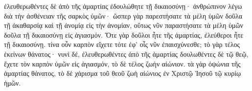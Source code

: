 \documentclass{openreader}
\begin{document}
ἐλευθερωθέντες δὲ ἀπὸ τῆς ἁμαρτίας ἐδουλώθητε τῇ δικαιοσύνῃ· 
ἀνθρώπινον λέγω διὰ τὴν ἀσθένειαν τῆς σαρκὸς ὑμῶν· ὥσπερ γὰρ παρεστήσατε τὰ μέλη ὑμῶν δοῦλα τῇ ἀκαθαρσίᾳ καὶ τῇ ἀνομίᾳ εἰς τὴν ἀνομίαν, οὕτως νῦν παραστήσατε τὰ μέλη ὑμῶν δοῦλα τῇ δικαιοσύνῃ εἰς ἁγιασμόν. 
Ὅτε γὰρ δοῦλοι ἦτε τῆς ἁμαρτίας, ἐλεύθεροι ἦτε τῇ δικαιοσύνῃ. 
τίνα οὖν καρπὸν εἴχετε τότε ἐφ’ οἷς νῦν ἐπαισχύνεσθε; τὸ γὰρ τέλος ἐκείνων θάνατος· 
νυνὶ δέ, ἐλευθερωθέντες ἀπὸ τῆς ἁμαρτίας δουλωθέντες δὲ τῷ θεῷ, ἔχετε τὸν καρπὸν ὑμῶν εἰς ἁγιασμόν, τὸ δὲ τέλος ζωὴν αἰώνιον. 
τὰ γὰρ ὀψώνια τῆς ἁμαρτίας θάνατος, τὸ δὲ χάρισμα τοῦ θεοῦ ζωὴ αἰώνιος ἐν Χριστῷ Ἰησοῦ τῷ κυρίῳ ἡμῶν. 
\end{document}
